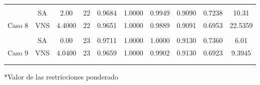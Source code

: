 \begin{table}
{\begin{tabular}{cccccccccc}
			&     &                                                                      &                                                                    &                                                         &        &        &        &        &              \\
			\multicolumn{1}{c|}{}                         & SA  & 2.00                                                                 & 22                                                                 & 0.9684                                                  & 1.0000 & 0.9949 & 0.9090 & 0.7238 & 10.31        \\
			\multicolumn{1}{c|}{\multirow{-2}{*}{Caso 8}} & VNS & 4.4000                                                               & 22                                                                 & 0.9651                                                  & 1.0000 & 0.9889 & 0.9091 & 0.6953 & 22.5359      \\
			&     &                                                                      &                                                                    &                                                         &        &        &        &        &              \\
			\multicolumn{1}{c|}{}                         & SA  & 0.00                                                                 & 23                                                                 & 0.9711                                                  & 1.0000 & 1.0000 & 0.9130 & 0.7360 & 6.01         \\
			\multicolumn{1}{c|}{\multirow{-2}{*}{Caso 9}} & VNS & 4.0400                                                               & 23                                                                 & 0.9659                                                  & 1.0000 & 0.9902 & 0.9130 & 0.6923 & 9.3945       \\
			&     &                                                                      &                                                                    &                                                         &        &        &        &        &              \\
			\multicolumn{10}{c}{}                                                                                                                                                                                                                                                                                        \\ \hline
		\end{tabular}%
	}
	\footnotesize{*Valor de las restricciones ponderado}
\end{table}


